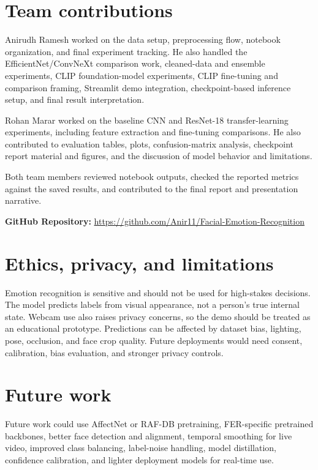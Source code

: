 \documentclass{article}
\begin{document}
\section{Team contributions}

Anirudh Ramesh worked on the data setup, preprocessing flow, notebook organization, and final experiment tracking. He also handled the EfficientNet/ConvNeXt comparison work, cleaned-data and ensemble experiments, CLIP foundation-model experiments, CLIP fine-tuning and comparison framing, Streamlit demo integration, checkpoint-based inference setup, and final result interpretation.

Rohan Marar worked on the baseline CNN and ResNet-18 transfer-learning experiments, including feature extraction and fine-tuning comparisons. He also contributed to evaluation tables, plots, confusion-matrix analysis, checkpoint report material and figures, and the discussion of model behavior and limitations.

Both team members reviewed notebook outputs, checked the reported metrics against the saved results, and contributed to the final report and presentation narrative.

\textbf{GitHub Repository:} \url{https://github.com/Anir11/Facial-Emotion-Recognition}

\section{Ethics, privacy, and limitations}

Emotion recognition is sensitive and should not be used for high-stakes decisions. The model predicts labels from visual appearance, not a person's true internal state. Webcam use also raises privacy concerns, so the demo should be treated as an educational prototype. Predictions can be affected by dataset bias, lighting, pose, occlusion, and face crop quality. Future deployments would need consent, calibration, bias evaluation, and stronger privacy controls.

\section{Future work}

Future work could use AffectNet or RAF-DB pretraining, FER-specific pretrained backbones, better face detection and alignment, temporal smoothing for live video, improved class balancing, label-noise handling, model distillation, confidence calibration, and lighter deployment models for real-time use.
\end{document}
